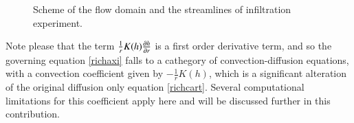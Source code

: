 \documentclass[review,times,3p,10pt]{elsarticle}
\newenvironment{lineq}
    {\begin{linenomath*}
    \begin{equation}
    }
    { 
    \end{equation} 
    \end{linenomath*}
    }
\renewcommand{\vec}{\mathbf}
\begin{document}
{%

 \begin{figure}
\centering
{}
 \caption{Scheme of the flow domain and the streamlines of infiltration experiment. }
 \label{valecproudy}
\end{figure}
Note please that the term $\frac{1}{r}K(h)\pdv{ h}{r}$ is a first order derivative term, and so the governing equation \eqref{richaxi} falls to a cathegory of convection-diffusion equations, with a convection coefficient given by $-\frac{1}{r}K(h)$, which is a significant alteration of the original diffusion only equation \eqref{richcart}. Several computational limitations for this coefficient apply here and will be discussed further in this contribution.

}
\end{document}
